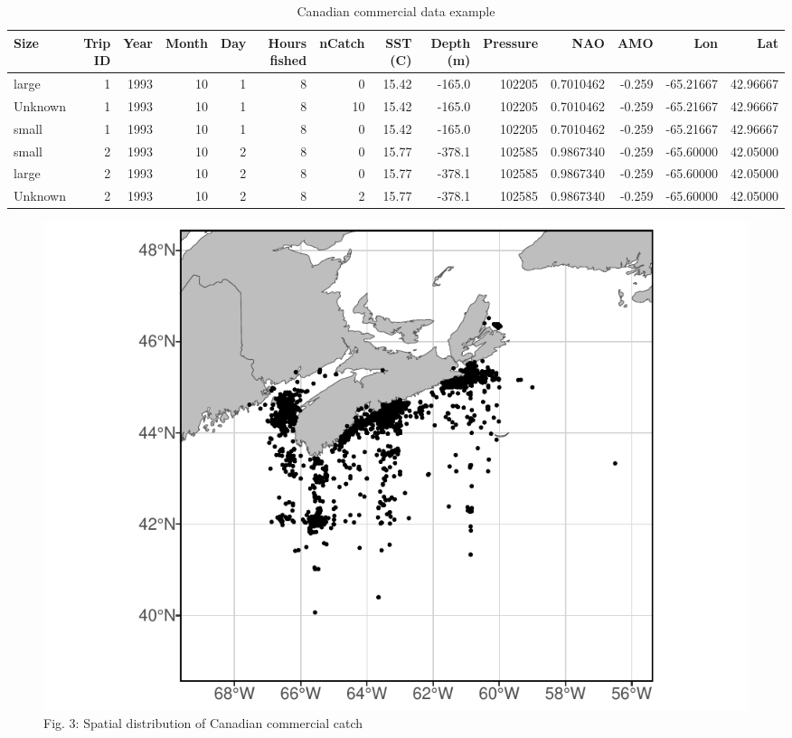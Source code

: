 \documentclass[
]{article}
\begin{document}
\begin{landscape}\begin{table}[H]

\caption{\label{tab:mergecan}Canadian commercial data example}
\centering
\begin{tabular}[t]{lrrrrrrrrrrrrr}
\toprule
Size & Trip
ID & Year & Month & Day & Hours
fished & nCatch & SST
(C) & Depth
(m) & Pressure & NAO & AMO & Lon & Lat\\
\midrule
large & 1 & 1993 & 10 & 1 & 8 & 0 & 15.42 & -165.0 & 102205 & 0.7010462 & -0.259 & -65.21667 & 42.96667\\
Unknown & 1 & 1993 & 10 & 1 & 8 & 10 & 15.42 & -165.0 & 102205 & 0.7010462 & -0.259 & -65.21667 & 42.96667\\
small & 1 & 1993 & 10 & 1 & 8 & 0 & 15.42 & -165.0 & 102205 & 0.7010462 & -0.259 & -65.21667 & 42.96667\\
small & 2 & 1993 & 10 & 2 & 8 & 0 & 15.77 & -378.1 & 102585 & 0.9867340 & -0.259 & -65.60000 & 42.05000\\
large & 2 & 1993 & 10 & 2 & 8 & 0 & 15.77 & -378.1 & 102585 & 0.9867340 & -0.259 & -65.60000 & 42.05000\\
\addlinespace
Unknown & 2 & 1993 & 10 & 2 & 8 & 2 & 15.77 & -378.1 & 102585 & 0.9867340 & -0.259 & -65.60000 & 42.05000\\
\bottomrule
\end{tabular}
\end{table}
\end{landscape}

\begin{figure}
\centering
\includegraphics{Model_Prelim_Report_files/figure-latex/canadianplot-1.pdf}
\caption{\label{fig:canadianplot}Fig. 3: Spatial distribution of Canadian commercial catch}
\end{figure}
\end{document}
